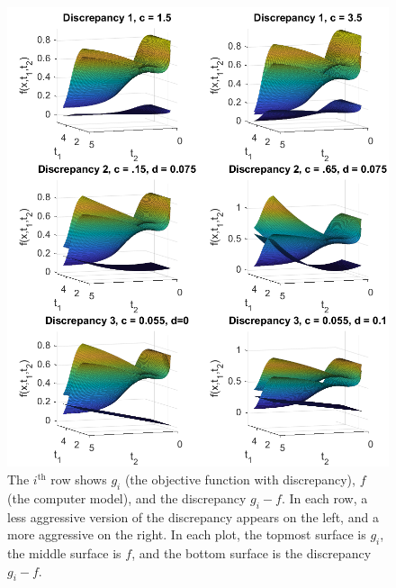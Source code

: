 \documentclass[12pt]{article}
\begin{document}
\begin{figure}
\centering
\includegraphics[scale=0.85]{FIG_six_discrepancies}
\captionsetup{width=.85\linewidth}
\caption{The $i^{\text{th}}$ row shows $g_i$ (the objective function with discrepancy), $f$ (the computer model), and the discrepancy $g_i-f$. In each row, a less aggressive version of the discrepancy appears on the left, and a more aggressive on the right. In each plot, the topmost surface is $g_i$, the middle surface is $f$, and the bottom surface is the discrepancy $g_i-f$.}
\label{fig:discrepancies}
\end{figure}
%
\end{document}
